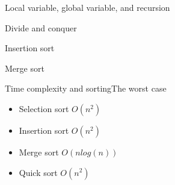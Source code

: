 \documentclass{beamer}
\begin{document}
\begin{frame}{Local variable, global variable, and recursion}



\end{frame}



\begin{frame}

\end{frame}





\begin{frame}{Divide and conquer}


\end{frame}

\begin{frame}{Insertion sort}

\end{frame}



\begin{frame}{Merge sort}


\end{frame}






\begin{frame}{Time complexity and sorting}{The worst case}

\begin{itemize}
\item Selection sort $O(n^{2})$
\item Insertion sort $O(n^{2})$
\item Merge sort $O(n log (n))$
\item Quick sort $O(n^{2})$
\end{itemize}


\end{frame}
\end{document}
